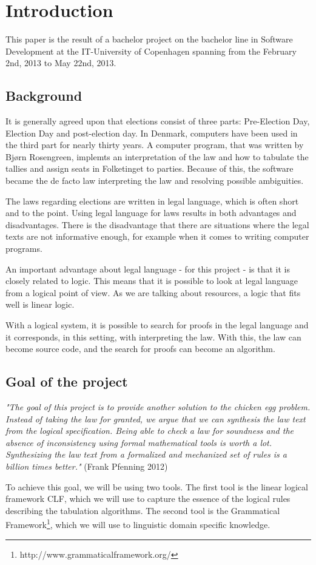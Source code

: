 \chapter{Introduction}
\label{01}

This paper is the result of a bachelor project on the bachelor line in Software Development at the IT-University of Copenhagen spanning from the February 2nd, 2013 to May 22nd, 2013.

\section{Background}
\label{01_01}

It is generally agreed upon that elections consist of three parts: Pre-Election Day, Election Day and post-election day. In Denmark, computers have been used in the third part for nearly thirty years. A computer program, that was written by Bjørn Rosengreen, implemts an interpretation of the law and how to tabulate the tallies and assign seats in Folketinget to parties. Because of this, the software became the de facto law interpreting the law and resolving possible ambiguities.

The laws regarding elections are written in legal language, which is often short and to the point. Using legal language for laws results in both advantages and disadvantages. There is the disadvantage that there are situations where the legal texts are not informative enough, for example when it comes to writing computer programs.

An important advantage about legal language - for this project - is that it is closely related to logic. This means that it is possible to look at legal language from a logical point of view. As we are talking about resources, a logic that fits well is linear logic.

With a logical system, it is possible to search for proofs in the legal language and it corresponds, in this setting, with interpreting the law. With this, the law can become source code, and the search for proofs can become an algorithm.

\section{Goal of the project}
\label{01_02}

\begin{texto2}
\textit{"The goal of this project is to provide another solution to the chicken egg problem. Instead of taking the law for granted, we argue that we can synthesis the law text from the logical specification. Being able to check a law for soundness and the absence of inconsistency using formal mathematical tools is worth a lot. Synthesizing the law text from a formalized and mechanized set of rules is a billion times better."} (Frank Pfenning 2012)
\end{texto2}

To achieve this goal, we will be using two tools. The first tool is the linear logical framework CLF, which we will use to capture the essence of the logical rules describing the tabulation algorithms. The second tool is the Grammatical Framework\footnote{http://www.grammaticalframework.org/}, which we will use to linguistic domain specific knowledge.